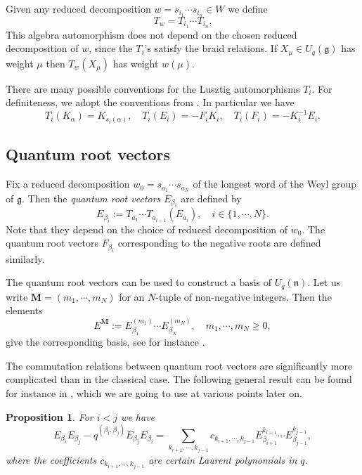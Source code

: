 \documentclass[a4paper, 12pt, reqno, english]{amsart}
\numberwithin{equation}{section}
\numberwithin{figure}{section}
\theoremstyle{plain}
\theoremstyle{plain}
\theoremstyle{plain}
\newtheorem{proposition}[theorem]{Proposition}
\theoremstyle{plain}
\theoremstyle{plain}
\theoremstyle{definition}
\theoremstyle{definition}
\theoremstyle{definition}
\theoremstyle{remark}
\theoremstyle{definition}
\theoremstyle{definition}
\newcommand{\Uqg}{U_q(\mathfrak{g})}
\newcommand{\Uqn}{U_q(\mathfrak{n})}
\newcommand{\lieg}{\mathfrak{g}}
\begin{document}
Given any reduced decomposition $w = s_{i_1} \cdots s_{i_n} \in W$ we define
\[
T_w = T_{i_1} \cdots T_{i_n}.
\]
This algebra automorphism does not depend on the chosen reduced decomposition of $w$, since the $T_i$'s satisfy the braid relations.
If $X_\mu \in \Uqg$ has weight $\mu$ then $T_w(X_\mu)$ has weight $w(\mu)$.

There are many possible conventions for the Lusztig automorphisms $T_i$.
For definiteness, we adopt the conventions from \cite[Section I.6.7]{brown-goodearl}. In particular we have
\begin{equation}
\label{eq:lusztig-relations}
T_i(K_\alpha) = K_{s_i(\alpha)}, \quad
T_i(E_i) = - F_i K_i, \quad
T_i(F_i) = - K_i^{-1} E_i.
\end{equation}

\subsection{Quantum root vectors}

Fix a reduced decomposition $w_0 = s_{a_1} \cdots s_{a_N}$ of the longest word of the Weyl group of $\lieg$.
Then the \emph{quantum root vectors} $E_{\beta_i}$ are defined by
\[
E_{\beta_i} := T_{a_1} \cdots T_{a_{i - 1}}(E_{a_i}), \quad i \in \{ 1, \cdots, N \}.
\]
Note that they depend on the choice of reduced decomposition of $w_0$.
The quantum root vectors $F_{\beta_i}$ corresponding to the negative roots are defined similarly.

The quantum root vectors can be used to construct a basis of $\Uqn$.
Let us write $\mathbf{M} = (m_1, \cdots, m_N)$ for an $N$-tuple of non-negative integers. Then the elements
\[
E^{\mathbf{M}} := E_{\beta_1}^{(m_1)} \cdots E_{\beta_N}^{(m_N)}, \quad m_1, \cdots, m_N \geq 0,
\]
give the corresponding basis, see for instance \cite[Section I.6.8]{brown-goodearl}.

The commutation relations between quantum root vectors are significantly more complicated than in the classical case.
The following general result can be found for instance in \cite[Section I.6.10]{brown-goodearl}, which we are going to use at various points later on.

\begin{proposition}
\label{prop:q-commutation-relations}
For $i < j$ we have
\[
E_{\beta_i} E_{\beta_j} - q^{(\beta_i, \beta_j)} E_{\beta_j} E_{\beta_i} = \sum_{k_{i + 1}, \cdots, k_{j - 1}} c_{k_{i + 1}, \cdots, k_{j - 1}} E_{\beta_{i + 1}}^{k_{i + 1}} \cdots E_{\beta_{j - 1}}^{k_{j - 1}},
\]
where the coefficients $c_{k_{i + 1}, \cdots, k_{j - 1}}$ are certain Laurent polynomials in $q$.
\end{proposition}
\end{document}
